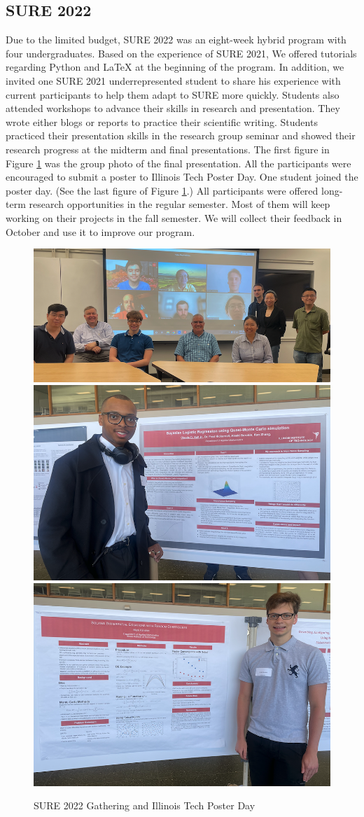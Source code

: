 \documentclass[11pt]{NSFamsart}
\begin{document}
\subsection{SURE 2022}

Due to the limited budget, SURE 2022 was an eight-week hybrid program with four undergraduates. Based on the experience of SURE 2021, We offered tutorials regarding Python and LaTeX at the beginning of the program. In addition, we invited one SURE 2021 underrepresented student to share his experience with current participants to help them adapt to SURE more quickly. Students also attended workshops to advance their skills in research and presentation. They wrote either blogs or reports to practice their scientific writing. Students practiced their presentation skills in the research group seminar and showed their research progress at the midterm and final presentations. The first figure in Figure \ref{fig:SURE2022} was the group photo of the final presentation. All the participants were encouraged to submit a poster to Illinois Tech Poster Day. One student joined the poster day. (See the last figure of Figure \ref{fig:SURE2022}.) All participants were offered long-term research opportunities in the regular semester. Most of them will keep working on their projects in the fall semester. We will collect their feedback in October and use it to improve our program.

\begin{figure}[h]
    \centering
    \includegraphics[width=0.37\linewidth]{SURE2022Final.png}
 \includegraphics[width=0.25\linewidth]{Poster1.png}
    \includegraphics[width=0.24\linewidth]{Poster2.png}
 \caption{SURE 2022 Gathering and Illinois Tech Poster Day}
    \label{fig:SURE2022}
\end{figure}
\end{document}
